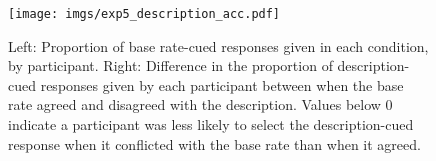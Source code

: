 \begin{figure}[ht]
  \centering
  \texttt{[image: imgs/exp5\_description\_acc.pdf]}
  \caption[Individual differences in the effect of base rates
  on participants' responses, Experiment 5.]{
    \label{fig:exp5_description_acc}
    Left: Proportion of base rate-cued responses given in each condition,
    by participant.
    Right: Difference in the proportion of description-cued responses given
    by each participant between when the base rate agreed and disagreed with
    the description. Values below 0 indicate a participant was less likely
    to select the description-cued response when it conflicted with the base rate
    than when it agreed.
  }
\end{figure}

